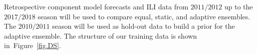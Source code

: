 \documentclass[sagev,times,Review,10pt]{sagej}
\begin{document}
Retrospective component model forecasts and ILI data from $2011/2012$ up to the $2017/2018$ season will be used to compare equal, static, and adaptive ensembles.
The $2010/2011$ season will be used as hold-out data to build a prior for the adaptive ensemble.
The structure of our training data is shown in~Figure~\ref{fig.DS}.


\end{document}
